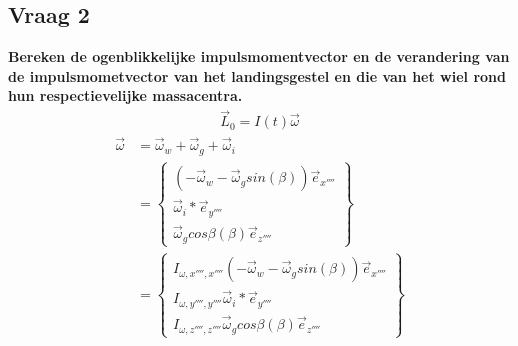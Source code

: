 \documentclass[a4paper,10pt]{article}
\begin{document}
\subsection{Vraag 2}
\textbf{Bereken de ogenblikkelijke impulsmomentvector en de verandering van de impulsmometvector van het landingsgestel en die van het wiel rond hun respectievelijke massacentra.}
\begin{equation}
\begin{aligned}
	\vec{L}_0 = I(t)\vec{\omega}
\end{aligned}
\end{equation}
\begin{equation}
\begin{aligned}
\vec{\omega} &= \vec{\omega}_w + \vec{\omega}_g + \vec{\omega}_i\\
&= \begin{Bmatrix}
(-\vec{\omega}_w -\vec{\omega}_g sin(\beta))\vec{e}_{x''''}\\
\vec{\omega}_i*\vec{e}_{y''''}\\
\vec{\omega}_g cos{\beta}(\beta)\vec{e}_{z''''}
\end{Bmatrix}\\
&=\begin{Bmatrix}
I_{\omega,x'''',x''''} (-\vec{\omega}_w -\vec{\omega}_g sin(\beta))\vec{e}_{x''''}\\
I_{\omega,y'''',y''''}\vec{\omega}_i*\vec{e}_{y''''}\\
I_{\omega,z'''',z''''}\vec{\omega}_g cos{\beta}(\beta)\vec{e}_{z''''}
\end{Bmatrix}
\end{aligned}
\end{equation}
\end{document}
